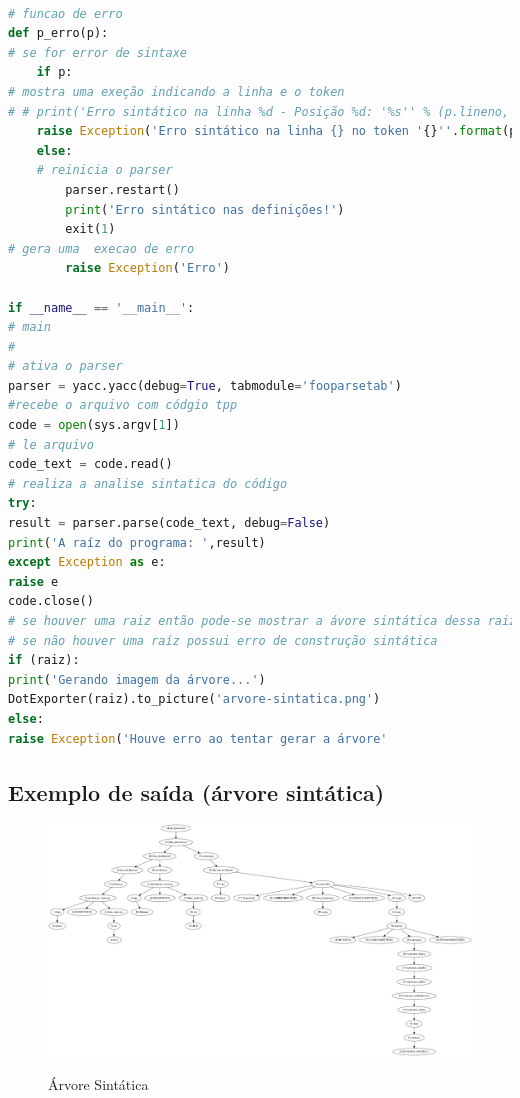 \documentclass[12pt]{article}
\begin{document}
\begin{lstlisting}[language= Python, caption= Função de Erros e Main do Parser, label=cod:coddp] 
 
# funcao de erro
def p_erro(p): 
# se for error de sintaxe    
	if p: 
# mostra uma exeção indicando a linha e o token     
# # print('Erro sintático na linha %d - Posição %d: '%s'' % (p.lineno, p.lexpos, p.value))     
	raise Exception('Erro sintático na linha {} no token '{}''.format(p.lineno, p.value))
	else: 
	# reinicia o parser    
		parser.restart()  
		print('Erro sintático nas definições!')
		exit(1)
# gera uma  execao de erro
		raise Exception('Erro')  
		
if __name__ == '__main__': 
# main 
#  
# ativa o parser  
parser = yacc.yacc(debug=True, tabmodule='fooparsetab') 
#recebe o arquivo com códgio tpp
code = open(sys.argv[1]) 
# le arquivo
code_text = code.read() 
# realiza a analise sintatica do código
try:
result = parser.parse(code_text, debug=False)  
print('A raíz do programa: ',result) 
except Exception as e:
raise e 
code.close()
# se houver uma raiz então pode-se mostrar a ávore sintática dessa raiz 
# se não houver uma raíz possui erro de construção sintática  
if (raiz):   
print('Gerando imagem da árvore...')
DotExporter(raiz).to_picture('arvore-sintatica.png') 
else:
raise Exception('Houve erro ao tentar gerar a árvore' 
\end{lstlisting}
\subsection{Exemplo de saída (árvore sintática)}   
\begin{figure}[H]  
	\centering  
	\caption{Árvore Sintática}
	\includegraphics[width=\textwidth, height=\textheight]{arvore-sintatica1} 
	\label{fig:arvoresimplificada1}
\end{figure} 
    
\end{document}

